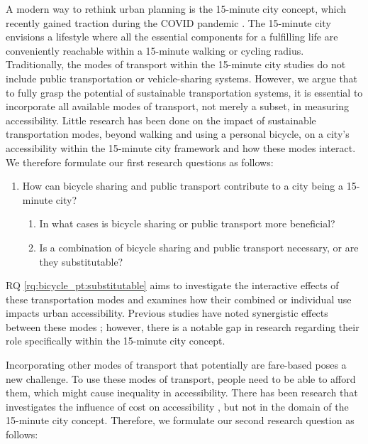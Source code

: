A modern way to rethink urban planning is the 15-minute city concept, which recently gained traction during the COVID pandemic .
The 15-minute city envisions a lifestyle where all the essential components for a fulfilling life are conveniently reachable within a 15-minute walking or cycling radius.
Traditionally, the modes of transport within the 15-minute city studies do not include public transportation or vehicle-sharing systems.
However, we argue that to fully grasp the potential of sustainable transportation systems, it is essential to incorporate all available modes of transport, not merely a subset, in measuring accessibility.
Little research has been done on the impact of sustainable transportation modes, beyond walking and using a personal bicycle, on a city's accessibility within the 15-minute city framework and how these modes interact.
We therefore formulate our first research questions as follows:
\begin{enumerate}
  \renewcommand{\labelenumi}{RQ \theenumi.}
  \item How can bicycle sharing and public transport contribute to a city being a 15-minute city?
  \label{rq:bicycle_pt}
  \begin{enumerate}
    \item In what cases is bicycle sharing or public transport more beneficial?
    \label{rq:bicycle_pt:beneficial}
    \item Is a combination of bicycle sharing and public transport necessary, or are they substitutable?
    \label{rq:bicycle_pt:substitutable}
  \end{enumerate}
\end{enumerate}
RQ \ref{rq:bicycle_pt:substitutable} aims to investigate the interactive effects of these transportation modes and examines how their combined or individual use impacts urban accessibility. 
Previous studies have noted synergistic effects between these modes ; however, there is a notable gap in research regarding their role specifically within the 15-minute city concept.

Incorporating other modes of transport that potentially are fare-based poses a new challenge.
To use these modes of transport, people need to be able to afford them, which might cause inequality in accessibility.
There has been research that investigates the influence of cost on accessibility , but not in the domain of the 15-minute city concept.
Therefore, we formulate our second research question as follows:

